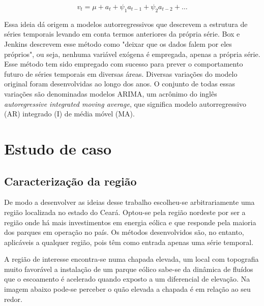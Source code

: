 \documentclass[
	12pt,				%
	openright,			%
	oneside,			%
	a4paper,			%
	english,			%
	french,				%
	spanish,			%
	brazil				%
	]{abntex2}
\begin{document}
$$ v_{t} = \mu + a_t + \psi_{1}a_{t-1} + \psi_{2}a_{t-2} + \dots $$

Essa ideia dá origem a modelos autorregressivos que descrevem a estrutura de séries temporais levando em conta termos anteriores da própria série. Box e Jenkins descrevem esse método como "deixar que os dados falem por eles próprios", ou seja, nenhuma variável exógena é empregada, apenas a própria série. Esse método tem sido empregado com sucesso para prever o comportamento futuro de séries temporais em diversas áreas. Diversas variações do modelo original foram desenvolvidas ao longo dos anos. O conjunto de todas essas variações são denominadas modelos ARIMA, um acrônimo do inglês \textit{autoregressive integrated moving average}, que significa modelo autorregressivo (AR) integrado (I) de média móvel (MA).


\cleardoublepage
\part{Estudo de caso}

\chapter{Caracterização da região}

De modo a desenvolver as ideias desse trabalho escolheu-se arbitrariamente uma região localizada no estado do Ceará. Optou-se pela região nordeste por ser a região onde há mais investimentos em energia eólica e que responde pela maioria dos parques em operação no país. Os métodos desenvolvidos são, no entanto, aplicáveis a qualquer região, pois têm como entrada apenas uma série temporal.

A região de interesse encontra-se numa chapada elevada, um local com topografia muito favorável a instalação de um parque eólico sabe-se da dinâmica de fluídos que o escoamento é acelerado quando exposto a um diferencial de elevação. Na imagem abaixo pode-se perceber o quão elevada a chapada é em relação ao seu redor.
\end{document}
